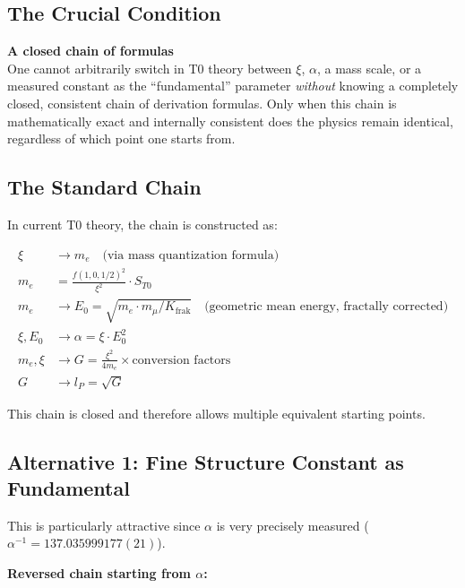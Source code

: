 	\subsection{The Crucial Condition}
	
	\begin{keyresult}
		\textbf{A closed chain of formulas}\\
		One cannot arbitrarily switch in T0 theory between $\xi$, $\alpha$, a mass scale, or a measured constant as the ``fundamental'' parameter \emph{without} knowing a completely closed, consistent chain of derivation formulas. Only when this chain is mathematically exact and internally consistent does the physics remain identical, regardless of which point one starts from.
	\end{keyresult}
	
	\subsection{The Standard Chain}
	
	In current T0 theory, the chain is constructed as:
	
	\begin{align}
		\xi &\to m_e \quad \text{(via mass quantization formula)} \nonumber\\
		m_e &= \frac{f(1,0,1/2)^2}{\xi^2} \cdot S_{T0} \\
		m_e &\to E_0 = \sqrt{m_e \cdot m_\mu/K_{\text{frak}}} \quad \text{(geometric mean energy, fractally corrected)} \\
		\xi, E_0 &\to \alpha = \xi \cdot E_0^2 \\
		m_e, \xi &\to G = \frac{\xi^2}{4 m_e} \times \text{conversion factors} \\
		G &\to l_P = \sqrt{G}
	\end{align}
	
	This chain is closed and therefore allows multiple equivalent starting points.
	
	\subsection{Alternative 1: Fine Structure Constant as Fundamental}
	
	This is particularly attractive since $\alpha$ is very precisely measured ($\alpha^{-1} = 137.035999177(21)$).
	
	\textbf{Reversed chain starting from $\alpha$:}
	
